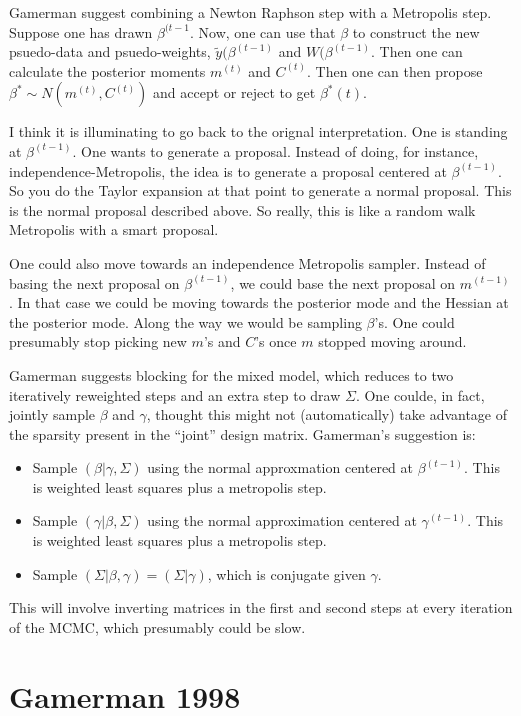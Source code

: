 \documentclass{article}
\begin{document}
Gamerman suggest combining a Newton Raphson step with a Metropolis step. Suppose
one has drawn $\beta^{(t-1}$.  Now, one can use that $\beta$ to construct the
new psuedo-data and psuedo-weights, $\tilde y(\beta^{(t-1)}$ and
$W(\beta^{(t-1)}$.  Then one can calculate the posterior moments $m^{(t)}$ and
$C^{(t)}$.  Then one can then propose $\beta^* \sim N(m^{(t)}, C^{(t)})$ and
accept or reject to get $\beta^*{(t)}$.

I think it is illuminating to go back to the orignal interpretation.  One is
standing at $\beta^{(t-1)}$.  One wants to generate a proposal.  Instead of
doing, for instance, independence-Metropolis, the idea is to generate a proposal
centered at $\beta^{(t-1)}$.  So you do the Taylor expansion at that point to
generate a normal proposal.  This is the normal proposal described above.  So
really, this is like a random walk Metropolis with a smart proposal.

One could also move towards an independence Metropolis sampler.  Instead of
basing the next proposal on $\beta^{(t-1)}$, we could base the next proposal on
$m^{(t-1)}$.  In that case we could be moving towards the posterior mode and the
Hessian at the posterior mode.  Along the way we would be sampling $\beta$'s.
One could presumably stop picking new $m$'s and $C$'s once $m$ stopped moving
around.

Gamerman suggests blocking for the mixed model, which reduces to two iteratively
reweighted steps and an extra step to draw $\Sigma$.  One coulde, in fact,
jointly sample $\beta$ and $\gamma$, thought this might not (automatically) take
advantage of the sparsity present in the ``joint'' design matrix.  Gamerman's
suggestion is:
\begin{itemize}
\item Sample $(\beta | \gamma, \Sigma)$ using the normal approxmation centered
  at $\beta^{(t-1)}$.  This is weighted least squares plus a metropolis step.
\item Sample $(\gamma | \beta, \Sigma)$ using the normal approximation centered
  at $\gamma^{(t-1)}$.  This is weighted least squares plus a metropolis step.
\item Sample $(\Sigma | \beta, \gamma) = (\Sigma | \gamma)$, which is conjugate
  given $\gamma$.
\end{itemize}
This will involve inverting matrices in the first and second steps at every
iteration of the MCMC, which presumably could be slow.

\section{Gamerman 1998}
\end{document}
